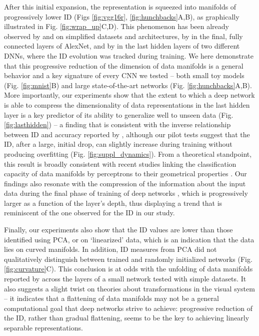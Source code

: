 \documentclass{article}
\begin{document}
After this initial expansion, the representation is squeezed into manifolds of progressively lower ID (Figs \ref{fig:vgg16r}, \ref{fig:hunchbacks}A,B), as  graphically illustrated in Fig. \ref{fig:wrap_up}C,D). This phenomenon has been already observed by \cite{basri2016efficient} and \cite{huang2018mechanisms} on simplified datasets and architectures, by \cite{yu2018curvature} in the final, fully connected layers of AlexNet, and by \cite{Ma_2018} in the last hidden layers of two different DNNs, where the ID evolution was tracked during training. 
We here demonstrate that this progressive reduction of the dimension of data manifolds is a general behavior and a key signature of every CNN we tested -- both small toy models (Fig. \ref{fig:mnist}B) and large state-of-the-art networks  (Fig. \ref{fig:hunchbacks}A,B). More importantly, our experiments show that the extent to which a deep network is able to compress the dimensionality of data representations in the last hidden layer is a key predictor of its ability to generalize well to unseen data (Fig. \ref{fig:lasthidden}) -- a finding that is consistent with the inverse relationship between ID and accuracy reported by \cite{Ma_2018}, although our pilot tests suggest that the ID, after a large, initial drop, can slightly increase during training without producing overfitting (Fig. \ref{fig:suppl_dynamics}). From a theoretical standpoint, this result is broadly consistent with recent studies linking the classification capacity of data manifolds by perceptrons to their geometrical properties \cite{chung2017manifolds, chung2016linear}.
Our findings also resonate with the compression of the information about the input data during the final phase of training of deep networks \cite{shwartz2017opening}, which is progressively larger as a function of the layer’s depth, thus displaying a trend that is reminiscent of the one observed for the ID in our study. 

Finally, our experiments also show that the ID values are lower than those identified using PCA, or on `linearized' data, which is an indication that the data lies on curved manifolds. In addition, ID measures from PCA did not qualitatively distinguish between trained and randomly initialized networks (Fig. \ref{fig:curvature}C). 
This conclusion is at odds with the unfolding of data manifolds reported by \cite{brahma2016deep} across the layers of a small network tested with simple datasets. It also suggests a slight twist on theories about transformations in the visual system \cite{dicarlo2012does, dicarlo2007untangling} -- it indicates that a flattening of data manifolds may not be a general computational goal that deep networks strive to achieve: progressive reduction of the ID, rather than gradual flattening, seems to be the key to achieving linearly separable representations.
 
\end{document}
